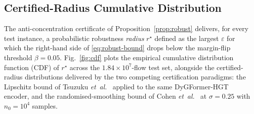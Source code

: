 \documentclass[journal,10pt]{IEEEtran}
\theoremstyle{definition}
\theoremstyle{remark}
\begin{document}
\subsection{Certified-Radius Cumulative Distribution}\label{subsec:cdf}
The anti-concentration certificate of Proposition~\ref{prop:robust}
delivers, for every test instance, a probabilistic robustness
\emph{radius} $r^\star$ defined as the largest $\varepsilon$ for which
the right-hand side of \eqref{eq:robust-bound} drops below the
margin-flip threshold $\beta = 0.05$. Fig.~\ref{fig:cdf} plots the
empirical cumulative distribution function (CDF) of $r^\star$ across
the $1.84\times 10^{7}$-flow test set, alongside the certified-radius
distributions delivered by the two competing certification paradigms:
the Lipschitz bound of Tsuzuku \textit{et~al.}~\cite{tsuzuku2018lipschitz}
applied to the same DyGFormer-HGT encoder, and the randomised-smoothing
bound of Cohen \textit{et~al.}~\cite{cohen2019smoothing} at
$\sigma=0.25$ with $n_0=10^4$ samples.
\end{document}

